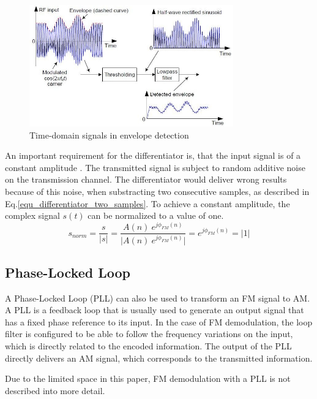\documentclass[conference]{IEEEtran}
\begin{document}
    \begin{figure}[!h]
      \centering
        \includegraphics[width=8.8cm]{img/envelope-detect-time-domain.jpg}
      \caption{Time-domain signals in envelope detection \cite{ref_roppel}}
      \label{fig_time_domain_envelope_detect}
    \end{figure}

    An important requirement for the differentiator is, that the input signal is of a constant amplitude \cite{ref_schnyder_haller}.
    The transmitted signal is subject to random additive noise on the transmission channel.
    The differentiator would deliver wrong results because of this noise, when substracting two consecutive samples, as described in Eq.\ref{equ_differentiator_two_samples}.
    To achieve a constant amplitude, the complex signal $s(t)$ can be normalized to a value of one.
    \begin{equation}
      s_{norm} = \frac{s}{|s|} = \frac{A(n)\ e^{j\phi_{FM}(n)}}{|{A(n)\ e^{j\phi_{FM}(n)}|}} = e^{j\phi_{FM}(n)} = |1|
    \end{equation}



  \subsection{Phase-Locked Loop}
    A Phase-Locked Loop (PLL) can also be used to transform an FM signal to AM.
    A PLL is a feedback loop that is usually used to generate an output signal that has a fixed phase reference to its input.
    In the case of FM demodulation, the loop filter is configured to be able to follow the frequency variations on the input, which is directly related to the encoded information.
    The output of the PLL directly delivers an AM signal, which corresponds to the transmitted information. \cite{ref_schnyder_haller}

    Due to the limited space in this paper, FM demodulation with a PLL is not described into more detail.
\end{document}
